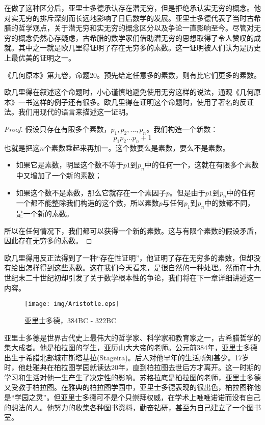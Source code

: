 \documentclass{article}
\begin{document}
在做了这种区分后，亚里士多德承认存在潜无穷，但是拒绝承认实无穷的概念。他对实无穷的排斥深刻而长远地影响了日后数学的发展\cite{HanXueTao16}。亚里士多德代表了当时古希腊的哲学观点，关于潜无穷和实无穷的概念区分以及争论一直影响至今。尽管对无穷的概念仍然心存疑虑，古希腊的数学家们借助潜无穷的思想取得了令人赞叹的成就。其中之一就是欧几里得证明了存在无穷多的素数。这一证明被人们认为是历史上最优美的证明之一。

\begin{theorem}
《几何原本》第九卷，命题20。预先给定任意多的素数，则有比它们更多的素数\cite{Elements}。
\end{theorem}

欧几里得在叙述这个命题时，小心谨慎地避免使用无穷这样的说法，通观《几何原本》一书这样的例子还有很多。欧几里得在证明这个命题时，使用了著名的反证法。我们用现代的语言来描述这一证明。

\begin{proof}
假设只存在有限多个素数，$p_1, p_2, ..., p_n$。我们构造一个新数：
\[
p_1 p_2 ... p_n + 1
\]
也就是把这$n$个素数乘起来再加一。这个数要么是素数，要么不是素数。

\begin{itemize}
\item 如果它是素数，明显这个数不等于$p1$到$p_n$中的任何一个，这就在有限多个素数中又增加了一个新的素数；
\item 如果这个数不是素数，那么它就存在一个素因子$p$。但是由于$p1$到$p_n$中的任何一个都不能整除我们构造的这个数，所以素数$p$与任何$p_1$到$p_n$中的数都不同，是一个新的素数。
\end{itemize}
所以在任何情况下，我们都可以获得一个新的素数。这与有限个素数的假设矛盾，因此存在无穷多的素数。
\end{proof}

欧几里得用反正法得到了一种“存在性证明”，他证明了存在无穷多的素数，但却没有给出怎样得到这些素数。这在我们今天看来，是很自然的一种处理。然而在十九世纪末二十世纪初却引发了关于数学根本性的争论，我们将在下一章详细讲述这一内容。

\begin{wrapfigure}{L}{0.3\textwidth}
 \centering
 \texttt{[image: img/Aristotle.eps]}
 \captionsetup{labelformat=empty}
 \caption{亚里士多德，384BC - 322BC}
 \label{fig:Aristotle}
\end{wrapfigure}

亚里士多德是世界古代史上最伟大的哲学家、科学家和教育家之一，古希腊哲学的集大成者。他是柏拉图的学生，亚历山大大帝的老师。公元前384年，亚里士多德出生于希腊北部城市斯塔基拉(Stageira)。后人对他早年的生活所知甚少。17岁时，他赴雅典在柏拉图学园就读达20年，直到柏拉图去世后方才离开。这一时期的学习和生活对他一生产生了决定性的影响。苏格拉底是柏拉图的老师，亚里士多德又受教于柏拉图。在雅典的柏拉图学园中，亚里士多德表现的很出色，柏拉图称他是“学园之灵”。但亚里士多德可不是个只崇拜权威，在学术上唯唯诺诺而没有自己的想法的人。他努力的收集各种图书资料，勤奋钻研，甚至为自己建立了一个图书室。
\end{document}
